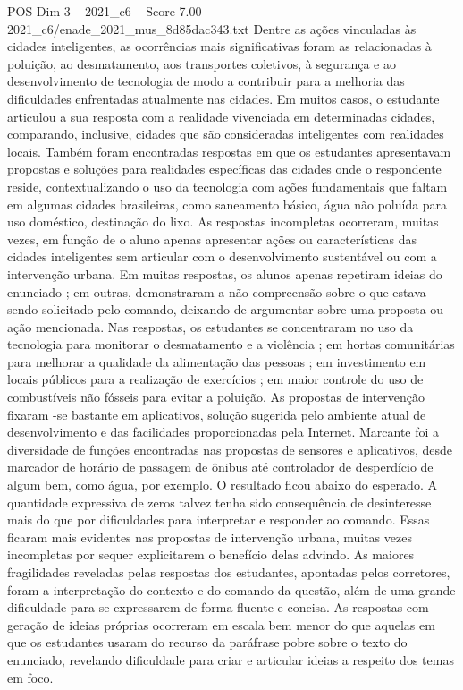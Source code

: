 \begin{textsample}{POS Dim 3 – 2021\_c6 – Score 7.00 – 2021\_c6/enade\_2021\_mus\_8d85dac343.txt}
Dentre as ações vinculadas às cidades inteligentes, as ocorrências mais significativas foram as relacionadas à poluição, ao desmatamento, aos transportes coletivos, à segurança e ao desenvolvimento de tecnologia de modo a contribuir para a melhoria das dificuldades enfrentadas atualmente nas cidades.
Em muitos casos, o estudante articulou a sua resposta com a realidade vivenciada em determinadas cidades, comparando, inclusive, cidades que são consideradas inteligentes com realidades locais.
Também foram encontradas respostas em que os estudantes apresentavam propostas e soluções para realidades específicas das cidades onde o respondente reside, contextualizando o uso da tecnologia com ações fundamentais que faltam em algumas cidades brasileiras, como saneamento básico, água não poluída para uso doméstico, destinação do lixo.
As respostas incompletas ocorreram, muitas vezes, em função de o aluno apenas apresentar ações ou características das cidades inteligentes sem articular com o desenvolvimento sustentável ou com a intervenção urbana.
Em muitas respostas, os alunos apenas repetiram ideias do enunciado ; em outras, demonstraram a não compreensão sobre o que estava sendo solicitado pelo comando, deixando de argumentar sobre uma proposta ou ação mencionada.
Nas respostas, os estudantes se concentraram no uso da tecnologia para monitorar o desmatamento e a violência ; em hortas comunitárias para melhorar a qualidade da alimentação das pessoas ; em investimento em locais públicos para a realização de exercícios ; em maior controle do uso de combustíveis não fósseis para evitar a poluição.
As propostas de intervenção fixaram -se bastante em aplicativos, solução sugerida pelo ambiente atual de desenvolvimento e das facilidades proporcionadas pela Internet.
Marcante foi a diversidade de funções encontradas nas propostas de sensores e aplicativos, desde marcador de horário de passagem de ônibus até controlador de desperdício de algum bem, como água, por exemplo.
O resultado ficou abaixo do esperado.
A quantidade expressiva de zeros talvez tenha sido consequência de desinteresse mais do que por dificuldades para interpretar e responder ao comando.
Essas ficaram mais evidentes nas propostas de intervenção urbana, muitas vezes incompletas por sequer explicitarem o benefício delas advindo.
As maiores fragilidades reveladas pelas respostas dos estudantes, apontadas pelos corretores, foram a interpretação do contexto e do comando da questão, além de uma grande dificuldade para se expressarem de forma fluente e concisa.
As respostas com geração de ideias próprias ocorreram em escala bem menor do que aquelas em que os estudantes usaram do recurso da paráfrase pobre sobre o texto do enunciado, revelando dificuldade para criar e articular ideias a respeito dos temas em foco.

\end{textsample}
